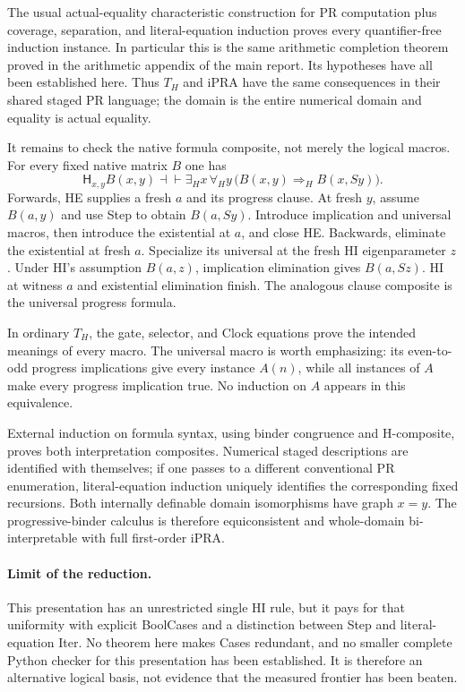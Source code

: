 The usual actual-equality characteristic construction for
PR computation plus coverage, separation, and literal-equation
induction proves every quantifier-free induction instance.  In
particular this is the same arithmetic completion theorem proved in
the arithmetic appendix of the main report.  Its hypotheses have all
been established here.  Thus $T_H$ and iPRA have the same consequences
in their shared staged PR language; the domain is the entire numerical
domain and equality is actual equality.

It remains to check the native formula composite, not merely the
logical macros.  For every fixed native matrix $B$ one has
\[
 \mathsf H_{x,y}B(x,y)\dashv\vdash
 \exists_H x\,\forall_H y\,
       \bigl(B(x,y)\Rightarrow_H B(x,Sy)\bigr).
 \tag{H-composite}
\]
Forwards, HE supplies a fresh $a$ and its progress clause.  At fresh
$y$, assume $B(a,y)$ and use Step to obtain $B(a,Sy)$.  Introduce
implication and universal macros, then introduce the existential at
$a$, and close HE.  Backwards, eliminate the existential at fresh
$a$.  Specialize its universal at the fresh HI eigenparameter $z$.
Under HI's assumption $B(a,z)$, implication elimination gives
$B(a,Sz)$.  HI at witness $a$ and existential elimination finish.
The analogous clause composite is the universal progress formula.

In ordinary $T_H$, the gate, selector, and Clock equations prove the
intended meanings of every macro.  The universal macro is worth
emphasizing: its even-to-odd progress implications give every instance
$A(n)$, while all instances of $A$ make every progress implication
true.  No induction on $A$ appears in this equivalence.

External induction on formula syntax, using binder congruence and
H-composite, proves both interpretation composites.  Numerical staged
descriptions are identified with themselves; if one passes to a
different conventional PR enumeration, literal-equation induction
uniquely identifies the corresponding fixed recursions.  Both
internally definable domain isomorphisms have graph $x=y$.
The progressive-binder calculus is therefore equiconsistent and
whole-domain bi-interpretable with full first-order iPRA.

\paragraph{Limit of the reduction.}
This presentation has an unrestricted single HI rule, but it pays for
that uniformity with explicit BoolCases and a distinction between Step and
literal-equation Iter.  No theorem here makes Cases redundant, and no
smaller complete Python checker for this presentation has been
established.  It is therefore an alternative logical basis, not evidence
that the measured frontier has been beaten.
